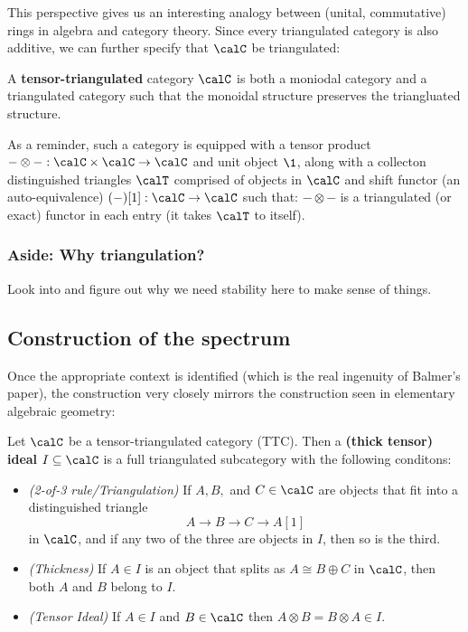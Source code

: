 \documentclass[12pt]{article}
\begin{document}
This perspective gives us an interesting analogy between (unital, commutative) rings in algebra and category theory. Since every 
triangulated category is also additive, we can further specify that $\calC$ be triangulated:
\begin{defn}
	A \textbf{tensor-triangulated} category $\calC$ is both a moniodal category and a triangulated category such that 
	the monoidal structure preserves the triangluated structure. 

	As a reminder, such a category is equipped with a tensor product $-\otimes -:\calC\times\calC\to \calC$ and unit object $\1$, along with
	a collecton distinguished triangles $\calT$ comprised of objects in $\calC$ and shift functor (an auto-equivalence) $(-)[1]:\calC\to \calC$ such that:
	$-\otimes-$ is a triangulated (or exact) functor in each entry (it takes $\calT$ to itself).
\end{defn}

\subsubsection{Aside: Why triangulation?}
{\color{red} Look into and figure out why we need stability here to make sense of things.}

\subsection{Construction of the spectrum}
Once the appropriate context is identified (which is the real ingenuity of Balmer's paper), the construction 
very closely mirrors the construction seen in elementary algebraic geometry:
\begin{defn}
	Let $\calC$ be a tensor-triangulated category (TTC). Then a \textbf{(thick tensor) ideal} $I\subseteq \calC$ is a full triangulated subcategory 
	with the following conditons:
	\begin{itemize}
		\item \textit{(2-of-3 rule/Triangulation)} If $A,B,$ and $C\in\calC$ are objects that fit into a distinguished triangle
		\[A\to B\to C\to A[1]\]
		in $\calC$, and if any two of the three are objects in $I$, then so is the third.
		\item \textit{(Thickness)} If $A\in I$ is an object that splits as $A\cong B\oplus C$ in $\calC$, then both $A$ and $B$ belong to $I$.
		\item \textit{(Tensor Ideal)} If $A\in I$ and $B\in \calC$ then $A\otimes B=B\otimes A\in I$.
	\end{itemize}
\end{defn}
\end{document}
